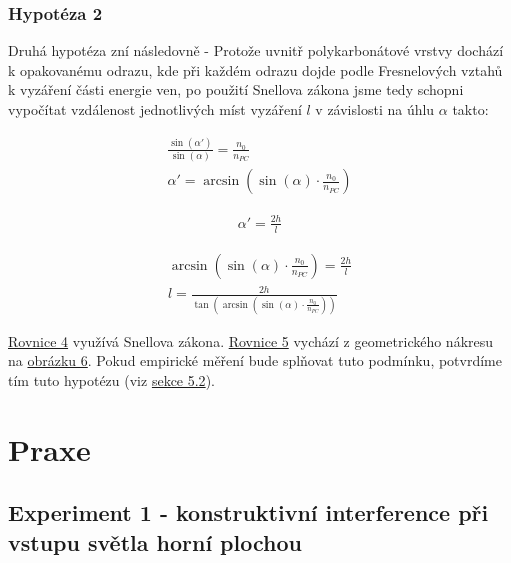 \documentclass[titlepage]{article}
\begin{document}
\subsubsection{Hypotéza 2}
 \label{hyp:2}

Druhá hypotéza zní následovně - Protože uvnitř polykarbonátové vrstvy dochází k opakovanému odrazu, kde při každém odrazu dojde podle Fresnelových vztahů k vyzáření části energie ven, po použití Snellova zákona jsme tedy schopni vypočítat vzdálenost jednotlivých míst vyzáření $l$ v závislosti na úhlu $\alpha$ takto:

\begin{equation}\label{eq4}
    \begin{gathered}
        \frac{\sin(\alpha')}{\sin(\alpha)} = \frac{n_0}{n_{PC}} \\
        \alpha' = \arcsin{\left(\sin(\alpha) \cdot \frac{n_0}{n_{PC}}\right)}
    \end{gathered}
\end{equation}

\begin{equation}\label{eq5}
    \begin{gathered}
        \alpha' = \frac{2h}{l}
    \end{gathered}
\end{equation}

\begin{equation}\label{eq6}
    \begin{gathered}
        \arcsin{\left(\sin(\alpha) \cdot \frac{n_0}{n_{PC}}\right)} = \frac{2h}{l} \\
        l = \frac{2h}{\tan{\left(\arcsin{\left(\sin(\alpha) \cdot \frac{n_0}{n_{PC}}\right)}\right)}}
    \end{gathered}
\end{equation}

\hyperref[eq4]{Rovnice 4} využívá Snellova zákona.
\hyperref[eq5]{Rovnice 5} vychází z geometrického nákresu na \hyperref[image:6]{obrázku 6}.
Pokud empirické měření bude splňovat tuto podmínku, potvrdíme tím tuto hypotézu (viz \hyperref[exp:2]{sekce 5.2}).

\section{Praxe}

\label{exp:1}
\subsection{Experiment 1 - konstruktivní interference při vstupu světla horní plochou}
\end{document}
